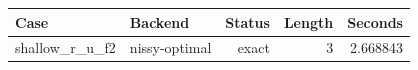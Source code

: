 {\small
\begin{tabular}{llrrr}
\hline
Case & Backend & Status & Length & Seconds \\
\hline
shallow\_r\_u\_f2 & nissy-optimal & exact & 3 & 2.668843 \\
\hline
\end{tabular}
}
